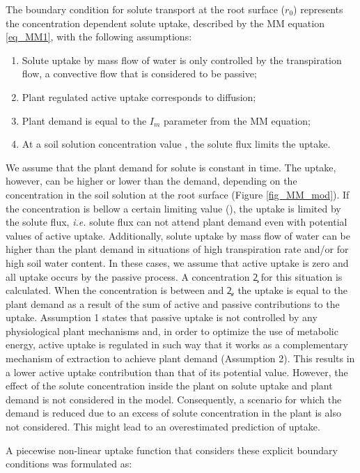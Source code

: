 The boundary condition for solute transport at the root surface ($r_0$) represents the concentration dependent solute uptake, described by the MM equation \ref{eq_MM1}, with the following assumptions:
\begin{enumerate}
\item  Solute uptake by mass flow of water is only controlled by the transpiration flow, a convective flow that is considered to be passive;
\item  Plant regulated active uptake corresponds to diffusion;
\item  Plant demand is equal to the $I_m$ parameter from the MM equation;
\item  At a soil solution concentration value \clim, the solute flux limits the uptake. 
\end{enumerate}

We assume that the plant demand for solute is constant in time.
The uptake, however, can be higher or lower than the demand, depending on the concentration in the soil solution at the root surface (Figure \ref{fig_MM_mod}). 
If the concentration is bellow a certain limiting value (\clim), the uptake is limited by the solute flux, {\it i.e.} solute flux can not attend plant demand even with potential values of active uptake.
Additionally, solute uptake by mass flow of water can be higher than the plant demand in situations of high transpiration rate and/or for high soil water content. 
In these cases, we assume that active uptake is zero and all uptake occurs by the passive process. 
A concentration \c2 for this situation is calculated.
When the concentration is between \clim{} and \c2, the uptake is equal to the plant demand as a result of the sum of active and passive contributions to the uptake.
Assumption 1 states that passive uptake is not controlled by any physiological plant mechanisms and, in order to optimize the use of metabolic energy, active uptake is regulated in such way that it works as a complementary mechanism of extraction to achieve plant demand (Assumption 2).
This results in a lower active uptake contribution than that of its potential value.
However, the effect of the solute concentration inside the plant on solute uptake and plant demand is not considered in the model.
Consequently, a scenario for which the demand is reduced due to an excess of solute concentration in the plant is also not considered.
This might lead to an overestimated prediction of uptake.

A piecewise non-linear uptake function that considers these explicit boundary conditions was formulated as:

